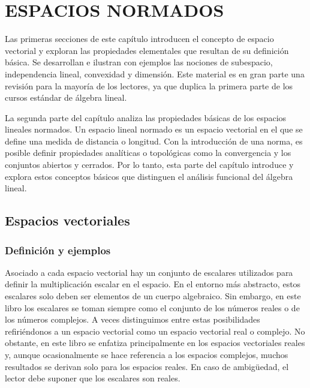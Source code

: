 \chapter{ESPACIOS NORMADOS}
\printchaptertableofcontents


Las primeras secciones de este capítulo introducen el concepto de espacio vectorial y exploran las propiedades elementales que resultan de su definición básica. Se desarrollan e ilustran con ejemplos las nociones de subespacio, independencia lineal, convexidad y dimensión. Este material es en gran parte una revisión para la mayoría de los lectores, ya que duplica la primera parte de los cursos estándar de álgebra lineal.

La segunda parte del capítulo analiza las propiedades básicas de los espacios lineales normados. Un espacio lineal normado es un espacio vectorial en el que se define una medida de distancia o longitud. Con la introducción de una norma, es posible definir propiedades analíticas o topológicas como la convergencia y los conjuntos abiertos y cerrados. Por lo tanto, esta parte del capítulo introduce y explora estos conceptos básicos que distinguen el análisis funcional del álgebra lineal.

\section{Espacios vectoriales}

\subsection{Definición y ejemplos}

Asociado a cada espacio vectorial hay un conjunto de escalares utilizados para definir la multiplicación escalar en el espacio. En el entorno más abstracto, estos escalares solo deben ser elementos de un cuerpo algebraico. Sin embargo, en este libro los escalares se toman siempre como el conjunto de los números reales o de los números complejos. A veces distinguimos entre estas posibilidades refiriéndonos a un espacio vectorial como un espacio vectorial real o complejo. No obstante, en este libro se enfatiza principalmente en los espacios vectoriales reales y, aunque ocasionalmente se hace referencia a los espacios complejos, muchos resultados se derivan solo para los espacios reales. En caso de ambigüedad, el lector debe suponer que los escalares son reales.

